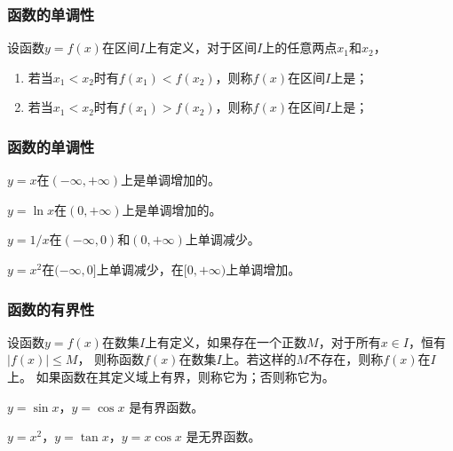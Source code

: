 \documentclass[14pt,notheorems,leqno,xcolor={rgb}]{beamer} %
\begin{document}
\begin{frame}
\frametitle{函数的单调性}
\begin{definition}
设函数$y=f(x)$在区间$I$上有定义，对于区间$I$上的任意两点$x_1$和$x_2$，
\begin{enumerate}
  \item 若当$x_1<x_2$时有$f(x_1)<f(x_2)$，则称$f(x)$在区间$I$上是；
  \item 若当$x_1<x_2$时有$f(x_1)>f(x_2)$，则称$f(x)$在区间$I$上是；
\end{enumerate}
\end{definition}
\end{frame}

\begin{frame}
\frametitle{函数的单调性}
\begin{example*}
$y=x$在$(-\infty,+\infty)$上是单调增加的。
\end{example*}
\vpause
\begin{example*}
$y=\ln x$在$(0,+\infty)$上是单调增加的。
\end{example*}
\vpause
\begin{example*}
$y=1/x$在$(-\infty,0)$和$(0,+\infty)$上单调减少。
\end{example*}
\vpause
\begin{example*}
$y=x^2$在$(-\infty,0]$上单调减少，在$[0,+\infty)$上单调增加。
\end{example*}
\end{frame}

\begin{frame}
\frametitle{函数的有界性}
\begin{definition}
设函数$y=f(x)$在数集$I$上有定义，如果存在一个正数$M$，对于所有$x\in I$，恒有$|f(x)|\le M$，
则称函数$f(x)$在数集$I$上。若这样的$M$不存在，则称$f(x)$在$I$上。\ppause
如果函数在其定义域上有界，则称它为；否则称它为。
\end{definition}
\vpause
\begin{example*}
$y=\sin x$，$y=\cos x$ 是有界函数。
\end{example*}
\pause
\begin{example*}
$y=x^2$，$y=\tan x$，$y=x\cos x$ 是无界函数。
\end{example*}
\end{frame}
\end{document}
